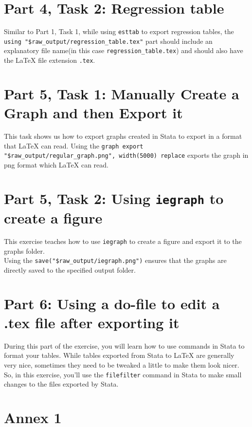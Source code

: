 \documentclass[]{article}
\begin{document}
\section*{Part 4, Task 2: Regression table}

Similar to Part 1, Task 1, while using \texttt{esttab} to export regression tables, the \verb|using "$raw_output/regression_table.tex"| part should include an explanatory file name(in this case \texttt{regression\_table.tex}) and should also have the {\LaTeX} file extension \texttt{.tex}.

\section*{Part 5, Task 1: Manually Create a Graph and then Export it}

This task shows us how to export graphs created in Stata to export in a format that {\LaTeX} can read. Using the \verb|graph export "$raw_output/regular_graph.png", width(5000) replace| 
exports the graph in png format which {\LaTeX} can read. 
\section*{Part 5, Task 2: Using \texttt{iegraph} to create a figure}
This exercise teaches how to use \texttt{iegraph} to create a figure and export it to the graphs folder. \\

Using the \verb|save("$raw_output/iegraph.png")| ensures that the graphs are directly saved to the specified output folder. 

\section*{Part 6: Using a do-file to edit a .tex file after exporting it}

During this part of the exercise, you will learn how to use commands in Stata to format your tables. While tables exported from Stata to {\LaTeX} are generally very nice, sometimes they need to be tweaked a little to make them look nicer. So, in this exercise, you'll use the \texttt{filefilter} command in Stata to make small changes to the files exported by Stata. 

\newpage
\section*{Annex 1} {\label{annex1}}
\end{document}
